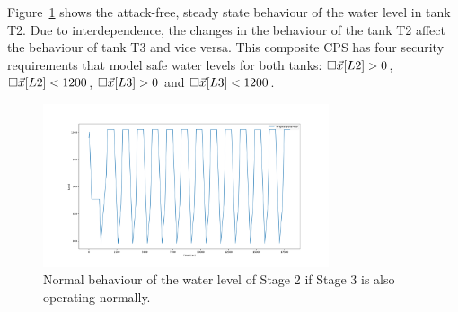 {{Figure~\ref{fig:CPSRobustness:Stage2Normal} shows the attack-free, steady state behaviour of the water level in tank T2. Due to interdependence, the changes in the behaviour of the tank T2 affect the behaviour of tank T3 and vice versa. This composite CPS has four security requirements that model safe water levels for both tanks: ${{\square}}{\vec{x}[L2]>0}$, ${{\square}}{\vec{x}[L2]<1200}$, ${{\square}}{\vec{x}[L3]>0}$ and ${{\square}}{\vec{x}[L3]<1200}$. 



\begin{figure}[t]
  \centering
  \includegraphics[width=0.75\textwidth]{Figures/Stage2Normal.png}
  \caption{Normal behaviour of the water level of Stage 2 if Stage 3 is also operating normally.}
  \label{fig:CPSRobustness:Stage2Normal}
\end{figure}

}}
